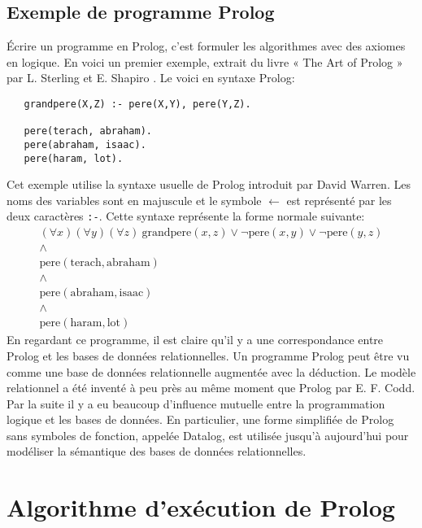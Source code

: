 \subsection{Exemple de programme Prolog}

Écrire un programme en Prolog, c'est formuler les algorithmes avec des axiomes en logique.
En voici un premier exemple, extrait du livre « The Art of Prolog » par L. Sterling et E. Shapiro \cite{pro}.
Le voici en syntaxe Prolog:
\begin{verbatim}
   grandpere(X,Z) :- pere(X,Y), pere(Y,Z).

   pere(terach, abraham).
   pere(abraham, isaac).
   pere(haram, lot).
\end{verbatim}
Cet exemple utilise la syntaxe usuelle de Prolog introduit par David Warren.
Les noms des variables sont en majuscule et
le symbole $\leftarrow$ est représenté par les deux caractères \verb+:-+.
Cette syntaxe représente la forme normale suivante:
\begin{equation}
\begin{array}{l}
(\forall x) (\forall y) (\forall z)\ \mathrm{grandpere}(x,z) \vee \neg \mathrm{pere}(x,y) \vee \neg \mathrm{pere}(y,z) \\
\wedge \\
\mathrm{pere}(\mathrm{terach},\mathrm{abraham}) \\
\wedge \\
\mathrm{pere}(\mathrm{abraham},\mathrm{isaac}) \\
\wedge \\
\mathrm{pere}(\mathrm{haram},\mathrm{lot})
\end{array}
\end{equation}
En regardant ce programme, il est claire qu'il y a une correspondance entre Prolog et les bases de données relationnelles.
Un programme Prolog peut être vu comme une base de données relationnelle augmentée avec la déduction.
Le modèle relationnel a été inventé à peu près au même moment que Prolog par E. F. Codd.
Par la suite
il y a eu beaucoup d'influence mutuelle entre la programmation logique et les bases de données.
En particulier, une forme simplifiée de Prolog sans symboles de fonction, appelée Datalog,
est utilisée jusqu'à aujourd'hui pour modéliser la sémantique
des bases de données relationnelles.

\section{Algorithme d'exécution de Prolog}

